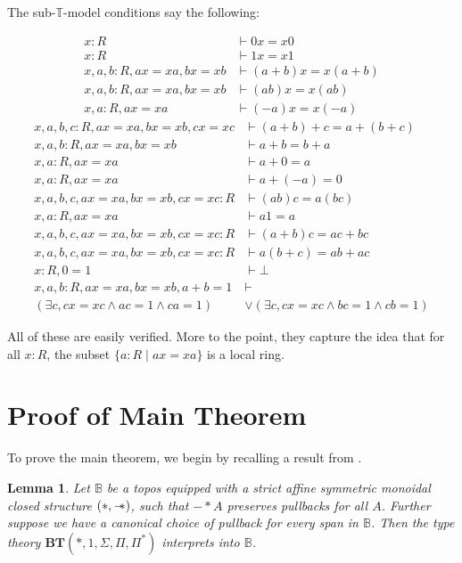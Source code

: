\documentclass{article}
\newtheorem{lemma}[theorem]{Lemma}
\newcommand*{\B}{\mathbb{B}}
\newcommand*{\T}{\mathbb{T}}
\newcommand*{\wand}{\mathbin{-\mkern-6mu*}}
\begin{document}
The sub-\(\T\)-model conditions say the following:
\begin{tcolorbox}[colback=blue!5!white, colframe=blue!50!black]
    \begin{align*}
        x : R &\vdash 0 x = x 0
        \\ x : R &\vdash 1 x = x 1
        \\ x,a,b : R, a x = x a, b x = x b &\vdash (a + b) x = x (a + b)
        \\ x,a,b : R, a x = x a, b x = x b &\vdash (a b) x = x (a b)
        \\ x,a : R, a x = x a &\vdash (-a) x = x (-a)
    \end{align*}
    \tcblower
    \begin{align*}
        x,a,b,c : R, ax=xa, bx=xb, cx=xc &\vdash (a + b) + c = a + (b + c)
        \\ x,a,b : R, ax=xa, bx=xb &\vdash a + b = b + a
        \\ x,a : R, ax=xa &\vdash a + 0 = a
        \\ x,a : R, ax=xa &\vdash a + (-a) = 0
        \\ x,a,b,c, ax=xa, bx=xb, cx=xc : R &\vdash (ab)c = a(bc)
        \\ x,a : R, ax=xa &\vdash a1 = a
        \\ x,a,b,c, ax=xa, bx=xb, cx=xc : R &\vdash (a + b) c = a c + b c
        \\ x,a,b,c, ax=xa, bx=xb, cx=xc : R &\vdash a (b + c) = a b + a c
        \\ x : R, 0 = 1 &\vdash \bot
        \\ x,a,b : R, ax=xa, bx=xb, a + b = 1 &\vdash \\
            (\exists c, cx=xc \land ac = 1 \land ca = 1) &\lor
            (\exists c, cx=xc \land bc = 1 \land cb = 1)        
    \end{align*}
\end{tcolorbox}

All of these are easily verified. More to the point, they capture the idea
that for all \(x : R\), the subset \(\{a : R \mid ax = xa\}\) is a local ring.

\section{Proof of Main Theorem}

To prove the main theorem, we begin by recalling a result from \cite{schopp}.

\begin{lemma}
    Let \(\B\) be a topos equipped with a strict affine symmetric monoidal closed structure \((*,\wand)\),
    such that \(- * A\) preserves pullbacks for all \(A\).
    Further suppose we have a canonical choice of pullback for every span in \(\B\).
    Then the type theory \(\mathbf{BT}(*, 1, \Sigma, \Pi, \Pi^*)\) interprets into \(\B\).
\end{lemma}
\end{document}
